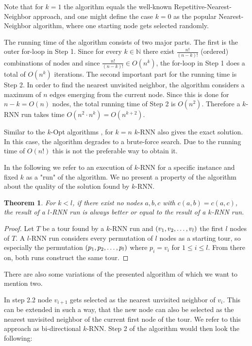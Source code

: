 \documentclass[11pt]{article}
\newtheorem{theorem}{Theorem}
\begin{document}
	Note that for $k = 1$ the algorithm equals the well-known Repetitive-Nearest-Neighbor approach, and one might define the case $k = 0$ as the popular Nearest-Neighbor algorithm, where one starting node gets selected randomly.
	
	The running time of the algorithm consists of two major parts. 
	The first is the outer for-loop in Step 1. 
	Since for every $k \in \mathbb{N}$ there exist $\frac{n!}{(n-k)!}$ (ordered) combinations of nodes and since $\frac{n!}{(n-k)!} \in O(n^k)$, the for-loop in Step 1 does a total of $O(n^k)$ iterations.
	The second important part for the running time is Step 2. In order to find the nearest unvisited neighbor, the algorithm considers a maximum of $n$ edges emerging from the current node. 
	Since this is done for $n - k = O(n)$ nodes, the total running time of Step 2 is $O(n^2)$.
	Therefore a $k$-RNN run takes time $O(n^2 \cdot n^k) = O(n^{k+2})$.
	
	Similar to the $k$-Opt algorithms \cite{CROES1958, LIN1973}, for $k = n$ $k$-RNN also gives the exact solution. In this case, the algorithm degrades to a brute-force search.
	Due to the running time of $O(n!)$ this is not the preferable way to obtain it.
	
	In the following we refer to an execution of $k$-RNN for a specific instance and fixed $k$ as a "run" of the algorithm.
	We no present a property of the algorithm about the quality of the solution found by $k$-RNN.
	\begin{theorem}
		For $k < l$, if there exist no nodes $a, b, c$ with $c(a, b) = c(a, c)$, the result of a $l$-RNN run is always better or equal to the result of a $k$-RNN run.
	\end{theorem}
	\begin{proof}
		Let $T$ be a tour found by a $k$-RNN run and $(v_1, v_2, \mathellipsis, v_l)$ the first $l$ nodes of $T$. 
		A $l$-RNN run considers every permutation of $l$ nodes as a starting tour, so especially the permutation $(p_1, p_2, \mathellipsis, p_l)$ where $p_i = v_i$ for $1 \leq i \leq l$. 
		From there on, both runs construct the same tour.
	\end{proof}
	
	There are also some variations of the presented algorithm of which we want to mention two.
	
	In step 2.2 node $v_{i+1}$ gets selected as the nearest unvisited neighbor of $v_i$. This can be extended in such a way, that the new node can also be selected as the nearest unvisited neighbor of the current first node of the tour. 
	We refer to this approach as bi-directional $k$-RNN. Step 2 of the algorithm would then look the following:
	
\end{document}
